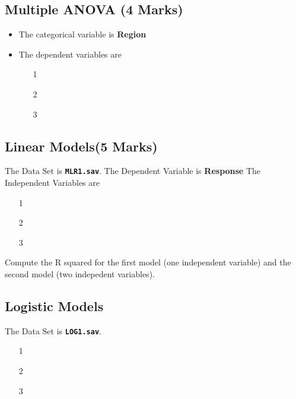 
\subsection{Multiple ANOVA (4 Marks)}
\begin{itemize}
\item The categorical variable is \textbf{Region}
\item The dependent variables are
\begin{itemize}
\item[1]
\item[2]
\item[3]
\end{itemize}
\end{itemize}
\subsection{Linear Models(5 Marks) }
The Data Set is \textbf{\texttt{MLR1.sav}}.
The Dependent Variable is \textbf{Response}
The Independent Variables are
\begin{itemize}
\item[1]
\item[2]
\item[3]
\end{itemize}
Compute the R squared for the first model (one independent variable) and the second model (two indepedent variables).
\subsection{Logistic Models}
The Data Set is \textbf{\texttt{LOG1.sav}}.
\begin{itemize}
\item[1]
\item[2]
\item[3]
\end{itemize}

